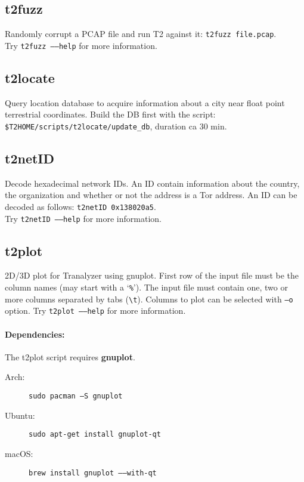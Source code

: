 \documentclass[documentation]{subfiles}
\begin{document}
\subsection{t2fuzz}\label{t2fuzz}
Randomly corrupt a PCAP file and run T2 against it: {\tt t2fuzz file.pcap}.\\
\noindent Try {\tt t2fuzz --{}--help} for more information.

\subsection{t2locate}\label{t2locate}
Query location database to acquire information about a city near float point terrestrial coordinates.
Build the DB first with the script: {\tt \$T2HOME/scripts/t2locate/update\_db}, duration ca 30 min.

\subsection{t2netID}\label{t2netID}
Decode hexadecimal network IDs.
An ID contain information about the country, the organization and whether or not the address is a Tor address.
An ID can be decoded as follows: {\tt t2netID 0x138020a5}.\\
\noindent Try {\tt t2netID --{}--help} for more information.

\subsection{t2plot}\label{t2plot}
2D/3D plot for Tranalyzer using gnuplot.
First row of the input file must be the column names (may start with a `{\tt \%}').
The input file must contain one, two or more columns separated by tabs ({\tt \textbackslash{}t}).
Columns to plot can be selected with {\tt --o} option.
Try {\tt t2plot --{}--help} for more information.

\paragraph{Dependencies:}
The t2plot script requires {\bf gnuplot}.
\begin{description}
    \item[Arch:] {\tt sudo pacman --S gnuplot}
    \item[Ubuntu:] {\tt sudo apt-get install gnuplot-qt}
    \item[macOS:] {\tt brew install gnuplot --{}--with-qt}
\end{description}
\end{document}

